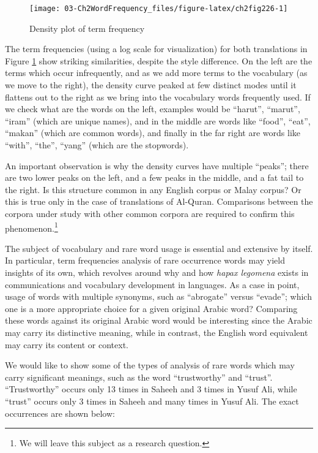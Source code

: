 \documentclass[
]{article}
\begin{document}
\begin{figure}

{\centering \texttt{[image: 03-Ch2WordFrequency\_files/figure-latex/ch2fig226-1]} 

}

\caption{Density plot of term frequency}\label{fig:ch2fig226}
\end{figure}

The term frequencies (using a log scale for visualization) for both translations in Figure \ref{fig:ch2fig226} show striking similarities, despite the style difference. On the left are the terms which occur infrequently, and as we add more terms to the vocabulary (as we move to the right), the density curve peaked at few distinct modes until it flattens out to the right as we bring into the vocabulary words frequently used. If we check what are the words on the left, examples would be ``harut'', ``marut'', ``iram'' (which are unique names), and in the middle are words like ``food'', ``eat'', ``makan'' (which are common words), and finally in the far right are words like ``with'', ``the'', ``yang'' (which are the stopwords).

An important observation is why the density curves have multiple ``peaks''; there are two lower peaks on the left, and a few peaks in the middle, and a fat tail to the right. Is this structure common in any English corpus or Malay corpus? Or this is true only in the case of translations of Al-Quran. Comparisons between the corpora under study with other common corpora are required to confirm this phenomenon.\footnote{We will leave this subject as a research question.}

The subject of vocabulary and rare word usage is essential and extensive by itself. In particular, term frequencies analysis of rare occurrence words may yield insights of its own, which revolves around why and how \emph{hapax legomena} exists in communications and vocabulary development in languages. As a case in point, usage of words with multiple synonyms, such as ``abrogate'' versus ``evade''; which one is a more appropriate choice for a given original Arabic word? Comparing these words against its original Arabic word would be interesting since the Arabic may carry its distinctive meaning, while in contrast, the English word equivalent may carry its content or context.

We would like to show some of the types of analysis of rare words which may carry significant meanings, such as the word ``trustworthy'' and ``trust''. ``Trustworthy'' occurs only 13 times in Saheeh and 3 times in Yusuf Ali, while ``trust'' occurs only 3 times in Saheeh and many times in Yusuf Ali. The exact occurrences are shown below:
\end{document}
